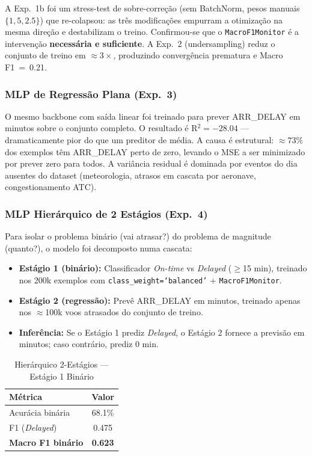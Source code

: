 \documentclass[conference]{IEEEtran}
\begin{document}
A Exp.~1b foi um stress-test de sobre-correção (sem BatchNorm, pesos manuais
$\{1, 5, 2.5\}$) que re-colapsou: as três modificações empurram a otimização na
mesma direção e destabilizam o treino. Confirmou-se que o
\texttt{MacroF1Monitor} é a intervenção \textbf{necessária e suficiente}. A
Exp.~2 (undersampling) reduz o conjunto de treino em $\approx 3\times$,
produzindo convergência prematura e Macro F1~=~0.21.

\subsubsection{MLP de Regressão Plana (Exp.~3)}

O mesmo backbone com saída linear foi treinado para prever ARR\_DELAY em minutos
sobre o conjunto completo. O resultado é R$^2 = -28.04$ — dramaticamente pior do que
um preditor de média. A causa é estrutural: $\approx 73\%$ dos exemplos têm
ARR\_DELAY perto de zero, levando o MSE a ser minimizado por prever zero para todos.
A variância residual é dominada por eventos do dia ausentes do dataset (meteorologia,
atrasos em cascata por aeronave, congestionamento ATC).

\subsubsection{MLP Hierárquico de 2 Estágios (Exp.~4)}

Para isolar o problema binário (vai atrasar?) do problema de magnitude (quanto?),
o modelo foi decomposto numa cascata:

\begin{itemize}
\item \textbf{Estágio 1 (binário):} Classificador \textit{On-time} vs
      \textit{Delayed} ($\geq$15 min), treinado nos 200k exemplos com
      \texttt{class\_weight=`balanced'} + \texttt{MacroF1Monitor}.
\item \textbf{Estágio 2 (regressão):} Prevê ARR\_DELAY em minutos, treinado apenas
      nos $\approx$100k voos atrasados do conjunto de treino.
\item \textbf{Inferência:} Se o Estágio 1 prediz \textit{Delayed}, o Estágio 2
      fornece a previsão em minutos; caso contrário, prediz 0 min.
\end{itemize}

\begin{table}[h]
\centering
\caption{Hierárquico 2-Estágios — Estágio 1 Binário}
\label{tab:stage1_binary}
\begin{tabular}{lc}
\toprule
\textbf{Métrica} & \textbf{Valor} \\
\midrule
Acurácia binária        & 68.1\% \\
F1 (\textit{Delayed})   & 0.475  \\
\textbf{Macro F1 binário} & \textbf{0.623} \\
\bottomrule
\end{tabular}
\end{table}
\end{document}
